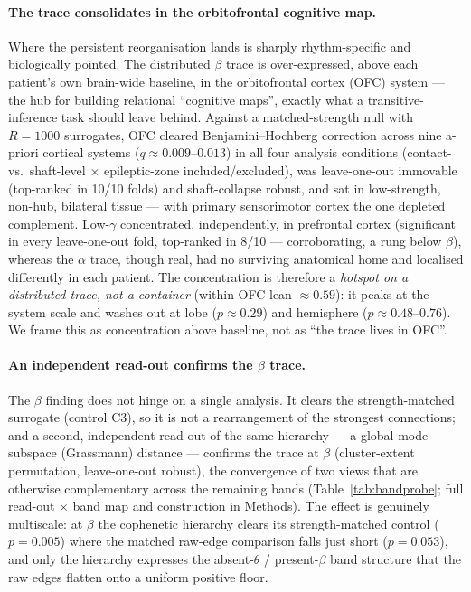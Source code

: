 \documentclass[11pt]{article}
\newcommand{\tab}[1]{Table~\ref{#1}}
\begin{document}
\paragraph{The trace consolidates in the orbitofrontal cognitive map.}
Where the persistent reorganisation lands is sharply rhythm-specific and
biologically pointed. The distributed $\beta$ trace is over-expressed, above each
patient's own brain-wide baseline, in the orbitofrontal cortex (OFC) system ---
the hub for building relational ``cognitive maps'', exactly what a
transitive-inference task should leave behind. Against a matched-strength null with
$R=1000$ surrogates, OFC cleared Benjamini--Hochberg correction across nine
a-priori cortical systems ($q\approx0.009$--$0.013$) in all four analysis
conditions (contact- vs.\ shaft-level $\times$ epileptic-zone included/excluded),
was leave-one-out immovable (top-ranked in 10/10 folds) and shaft-collapse robust,
and sat in low-strength, non-hub, bilateral tissue --- with primary sensorimotor
cortex the one depleted complement.
Low-$\gamma$ concentrated, independently, in prefrontal cortex (significant in
every leave-one-out fold, top-ranked in 8/10 --- corroborating, a rung below
$\beta$), whereas the $\alpha$ trace, though real, had no surviving anatomical home
and localised differently in each patient. The concentration is therefore a
\emph{hotspot on a distributed trace, not a container} (within-OFC lean
$\approx0.59$): it peaks at the system scale and washes out at lobe
($p\approx0.29$) and hemisphere ($p\approx0.48$--$0.76$). We frame this as
concentration above baseline, not as ``the trace lives in OFC''.

\paragraph{An independent read-out confirms the \texorpdfstring{$\beta$}{beta}
trace.}
The $\beta$ finding does not hinge on a single analysis. It clears the
strength-matched surrogate (control C3), so it is not a rearrangement of the
strongest connections; and a second, independent read-out of the same hierarchy
--- a global-mode subspace (Grassmann) distance --- confirms the trace at $\beta$
(cluster-extent permutation, leave-one-out robust), the convergence of two views
that are otherwise complementary across the remaining bands (\tab{tab:bandprobe};
full read-out $\times$ band map and construction in Methods).
The effect is genuinely multiscale: at $\beta$ the cophenetic hierarchy clears its
strength-matched control ($p=0.005$) where the matched raw-edge comparison falls
just short ($p=0.053$), and only the hierarchy expresses the absent-$\theta$ /
present-$\beta$ band structure that the raw edges flatten onto a uniform positive
floor.
\end{document}
